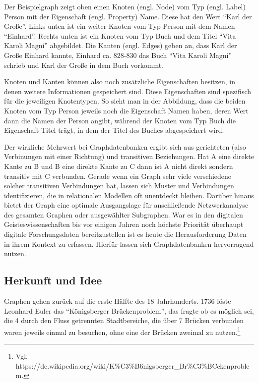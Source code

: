 Der Beispielgraph zeigt oben einen Knoten (engl. Node) vom Typ (engl.
Label) Person mit der Eigenschaft (engl. Property) Name. Diese hat den
Wert ``Karl der Große''. Links unten ist ein weiter Knoten vom Typ
Person mit dem Namen ``Einhard''. Rechts unten ist ein Knoten vom Typ
Buch und dem Titel ``Vita Karoli Magni'' abgebildet. Die Kanten (engl.
Edges) geben an, dass Karl der Große Einhard kannte, Einhard ca. 828-830
das Buch ``Vita Karoli Magni'' schrieb und Karl der Große in dem Buch
vorkommt.

Knoten und Kanten können also noch zusätzliche Eigenschaften besitzen,
in denen weitere Informationen gespeichert sind. Diese Eigenschaften
sind spezifisch für die jeweiligen Knotentypen. So sieht man in der
Abbildung, dass die beiden Knoten vom Typ Person jeweils noch die
Eigenschaft Namen haben, deren Wert dann die Namen der Person angibt,
während der Knoten vom Typ Buch die Eigenschaft Titel trägt, in dem der
Titel des Buches abgespeichert wird.

Der wirkliche Mehrwert bei Graphdatenbanken ergibt sich aus gerichteten
(also Verbinungen mit einer Richtung) und transitiven Beziehungen. Hat A
eine direkte Kante zu B und B eine direkte Kante zu C dann ist A nicht
direkt sondern transitiv mit C verbunden. Gerade wenn ein Graph sehr
viele verschiedene solcher transitiven Verbindungen hat, lassen sich
Muster und Verbindungen identifizieren, die in relationalen Modellen oft
unentdeckt bleiben. Darüber hinaus bietet der Graph eine optimale
Ausgangslage für anschließende Netzwerkanalyse des gesamten Graphen oder
ausgewählter Subgraphen. War es in den digitalen Geisteswissenschaften
bis vor einigen Jahren noch höchste Priorität überhaupt digitale
Forschungsdaten bereitzustellen ist es heute die Herausforderung Daten
in ihrem Kontext zu erfassen. Hierfür lassen sich Graphdatenbanken
hervorragend nutzen.

\hypertarget{herkunft-und-idee}{%
\subsection{Herkunft und Idee}\label{herkunft-und-idee}}

Graphen gehen zurück auf die erste Hälfte des 18 Jahrhunderts. 1736
löste Leonhard Euler das ``Königsberger Brückenproblem'', das fragte ob
es möglich sei, die 4 durch den Fluss getrennten Stadtbereiche, die über
7 Brücken verbunden waren jeweils einmal zu besuchen, ohne eine der
Brücken zweimal zu nutzen.\footnote{Vgl.
  https://de.wikipedia.org/wiki/K\%C3\%B6nigsberger\_Br\%C3\%BCckenproblem.}

